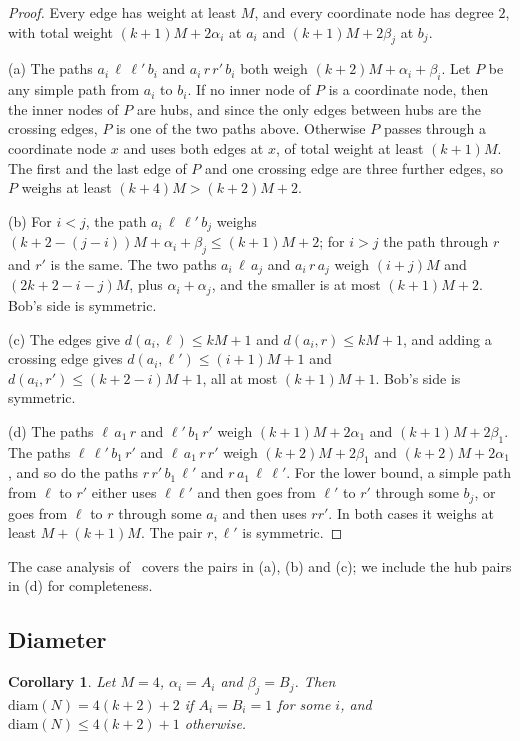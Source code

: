 \documentclass[11pt]{article}
\newtheorem{corollary}[theorem]{Corollary}
\theoremstyle{definition}
\theoremstyle{remark}
\newcommand{\diam}{\mathrm{diam}}
\begin{document}
\begin{proof}
Every edge has weight at least $M$, and every coordinate node has degree $2$, with total weight $(k+1)M+2\alpha_i$ at $a_i$ and $(k+1)M+2\beta_j$ at $b_j$.

(a) The paths $a_i\,\ell\,\ell'\,b_i$ and $a_i\,r\,r'\,b_i$ both weigh $(k+2)M+\alpha_i+\beta_i$. Let $P$ be any simple path from $a_i$ to $b_i$. If no inner node of $P$ is a coordinate node, then the inner nodes of $P$ are hubs, and since the only edges between hubs are the crossing edges, $P$ is one of the two paths above. Otherwise $P$ passes through a coordinate node $x$ and uses both edges at $x$, of total weight at least $(k+1)M$. The first and the last edge of $P$ and one crossing edge are three further edges, so $P$ weighs at least $(k+4)M>(k+2)M+2$.

(b) For $i<j$, the path $a_i\,\ell\,\ell'\,b_j$ weighs $(k+2-(j-i))M+\alpha_i+\beta_j\le(k+1)M+2$; for $i>j$ the path through $r$ and $r'$ is the same. The two paths $a_i\,\ell\,a_j$ and $a_i\,r\,a_j$ weigh $(i+j)M$ and $(2k+2-i-j)M$, plus $\alpha_i+\alpha_j$, and the smaller is at most $(k+1)M+2$. Bob's side is symmetric.

(c) The edges give $d(a_i,\ell)\le kM+1$ and $d(a_i,r)\le kM+1$, and adding a crossing edge gives $d(a_i,\ell')\le(i+1)M+1$ and $d(a_i,r')\le(k+2-i)M+1$, all at most $(k+1)M+1$. Bob's side is symmetric.

(d) The paths $\ell\,a_1\,r$ and $\ell'\,b_1\,r'$ weigh $(k+1)M+2\alpha_1$ and $(k+1)M+2\beta_1$. The paths $\ell\,\ell'\,b_1\,r'$ and $\ell\,a_1\,r\,r'$ weigh $(k+2)M+2\beta_1$ and $(k+2)M+2\alpha_1$, and so do the paths $r\,r'\,b_1\,\ell'$ and $r\,a_1\,\ell\,\ell'$. For the lower bound, a simple path from $\ell$ to $r'$ either uses $\ell\ell'$ and then goes from $\ell'$ to $r'$ through some $b_j$, or goes from $\ell$ to $r$ through some $a_i$ and then uses $rr'$. In both cases it weighs at least $M+(k+1)M$. The pair $r,\ell'$ is symmetric.
\end{proof}

The case analysis of~\cite{ACK20} covers the pairs in (a), (b) and (c); we include the hub pairs in (d) for completeness.

\subsection{Diameter}

\begin{corollary}\label{cor:diam}
Let $M=4$, $\alpha_i=A_i$ and $\beta_j=B_j$. Then $\diam(N)=4(k+2)+2$ if $A_i=B_i=1$ for some $i$, and $\diam(N)\le 4(k+2)+1$ otherwise.
\end{corollary}
\end{document}
